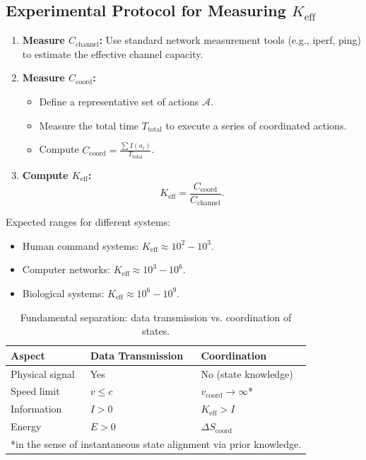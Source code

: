 \documentclass[12pt]{article}
\begin{document}
	\subsection{Experimental Protocol for Measuring $K_{\mathrm{eff}}$}
	\label{app:experiment}
	
	\begin{enumerate}
		\item \textbf{Measure $C_{\text{channel}}$:} Use standard network measurement tools (e.g., iperf, ping) to estimate the effective channel capacity.
		
		\item \textbf{Measure $C_{\text{coord}}$:}
		\begin{itemize}
			\item Define a representative set of actions $\mathcal{A}$.
			\item Measure the total time $T_{\text{total}}$ to execute a series of coordinated actions.
			\item Compute $C_{\text{coord}} = \frac{\sum I(a_i)}{T_{\text{total}}}$.
		\end{itemize}
		
		\item \textbf{Compute $K_{\mathrm{eff}}$:}
		\[
		K_{\mathrm{eff}} = \frac{C_{\text{coord}}}{C_{\text{channel}}}.
		\]
	\end{enumerate}
	
	Expected ranges for different systems:
	\begin{itemize}
		\item Human command systems: $K_{\mathrm{eff}} \approx 10^2 - 10^3$.
		\item Computer networks: $K_{\mathrm{eff}} \approx 10^3 - 10^6$.
		\item Biological systems: $K_{\mathrm{eff}} \approx 10^6 - 10^9$.
	\end{itemize}
	
	\begin{table}[htbp]
		\centering
		\caption{Fundamental separation: data transmission vs. coordination of states.}
		\label{tab:separation}
		\begin{tabular}{lp{6cm}p{6cm}}
			\toprule
			\textbf{Aspect} & \textbf{Data Transmission} & \textbf{Coordination} \\
			\midrule
			Physical signal & Yes & No (state knowledge) \\
			Speed limit & $v \leq c$ & $v_{\text{coord}} \to \infty$* \\
			Information & $I > 0$ & $K_{\text{eff}} > I$ \\
			Energy & $E > 0$ & $\Delta S_{\text{coord}}$ \\
			\bottomrule
			\multicolumn{3}{l}{*in the sense of instantaneous state alignment via prior knowledge.}
		\end{tabular}
	\end{table}
	
\end{document}
